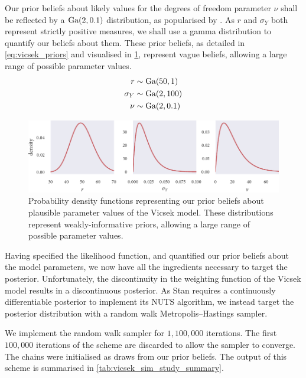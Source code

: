 Our prior beliefs about likely values for the degrees of freedom parameter $\nu$ shall be
reflected by a $\textrm{Ga}(2, 0.1)$ distribution, as popularised by \textcite{juarez10}.  As $r$
and $\sigma_Y$ both represent strictly positive measures, we shall use a gamma
distribution to quantify our beliefs about them. These prior beliefs, as detailed in
\cref{eq:vicsek_priors} and visualised in \cref{fig:vicsek_priors}, represent vague
beliefs, allowing a large range of possible parameter values.
\begin{align}
  \label{eq:vicsek_priors}
  \begin{split}
    r           & \sim \textrm{Ga}(50, 1) \\
    \sigma_Y    & \sim \textrm{Ga}(2, 100)\\
    \nu         & \sim \textrm{Ga}(2, 0.1)
  \end{split}
\end{align}
\begin{figure}[tb]
  \includegraphics{vicsek_priors.pdf}
  \caption{Probability density functions representing our prior beliefs about plausible
    parameter values of the Vicsek model. These distributions represent
    weakly-informative priors, allowing a large range of possible parameter values.}
  \label{fig:vicsek_priors}
\end{figure}

Having specified the likelihood function, and quantified our prior beliefs about the model
parameters, we now have all the ingredients necessary to target the posterior.
Unfortunately, the discontinuity in the weighting function of the Vicsek model results in
a discontinuous posterior. As Stan requires a continuously differentiable posterior to
implement its NUTS algorithm, we instead target the posterior distribution with a random
walk Metropolis--Hastings sampler.

We implement the random walk sampler for $1,100,000$ iterations. The first $100,000$
iterations of the scheme are discarded to allow the sampler to converge.  The chains were
initialised as draws from our prior beliefs. The output of this scheme is summarised in
\cref{tab:vicsek_sim_study_summary}.

